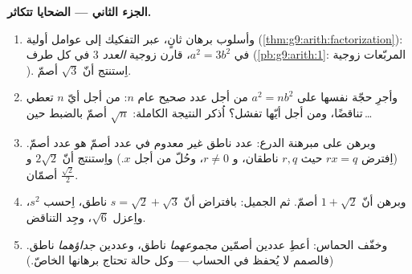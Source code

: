 \begin{problem}
\medskip
\noindent\textbf{الجزء الثاني --- الضحايا تتكاثر.}
\begin{enumerate}[resume]
  \item وأسلوب برهان ثانٍ، عبر التفكيك إلى عوامل أولية
        (\cref{thm:g9:arith:factorization}): في $a^2 = 3b^2$،
        قارن زوجية \emph{ العدد $3$} في كل طرف
        (\cref{pb:g9:arith:1}: المربّعات زوجية
        ). اِستنتج أنّ $\sqrt3$ أصمّ.
  \item وأجرِ حجّة  نفسها على $a^2 = n b^2$ من أجل عدد
        صحيح عام $n$: من أجل أيّ $n$ تعطي تناقضًا، ومن أجل أيّها
        تفشل؟ اُذكر النتيجة الكاملة: $\sqrt n$ أصمّ بالضبط
        حين\,\dots
  \item وبرهن على مبرهنة الدرع:  عدد ناطق غير معدوم في عدد
        أصمّ هو عدد أصمّ. (اِفترض $r x = q$ حيث $r, q$ ناطقان،
        و $r \neq 0$، وحُلّ من أجل $x$.) واِستنتج أنّ $2\sqrt2$
        و $\frac{\sqrt2}{2}$ أصمّان.
  \item وبرهن أنّ $1 + \sqrt2$ أصمّ. ثم الجميل: بافتراض أنّ
        $s = \sqrt2 + \sqrt3$ ناطق، اِحسب $s^2$، واِعزل $\sqrt6$،
        وجِد التناقض.
  \item وخفّف الحماس: أعطِ عددين أصمّين \emph{مجموعهما} ناطق،
        وعددين \emph{جداؤهما} ناطق. (فالصمم لا يُحفظ في الحساب
        --- وكل حالة تحتاج برهانها الخاصّ.)
\end{enumerate}


\end{problem}

